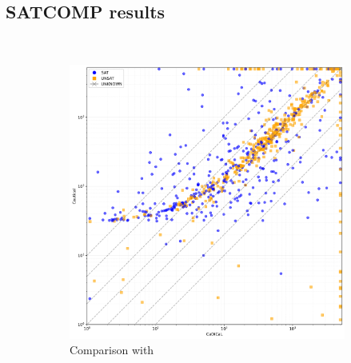 

\subsection{SATCOMP results}~\label{subsec:eval-satcomp}

\begin{figure}[!t]
    \centering
    \begin{subfigure}[t]{0.4\textwidth}
        \centering
        \includegraphics[width=\textwidth]{figs/cautical_vs_cadical_log.png}
        \caption{Comparison with \cadical}
        \label{fig:cautical-vs-cadical}
    \end{subfigure}
    \hspace{0.06\textwidth}
    \begin{subfigure}[t]{0.4\textwidth}
        \centering

\end{subfigure}
\end{figure}
